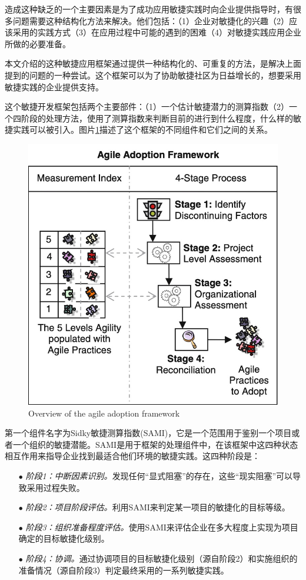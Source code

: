 \documentclass[twocolumn]{svjour3}[]
\begin{document}
造成这种缺乏的一个主要因素是为了成功应用敏捷实践时向企业提供指导时，有很多问题需要这种结构化方法来解决。他们包括：（1）企业对敏捷化的兴趣（2）应该采用的实践方式（3）在应用过程中可能的遇到的困难（4）对敏捷实践应用企业所做的必要准备。

本文介绍的这种敏捷应用框架通过提供一种结构化的、可重复的方法，是解决上面提到的问题的一种尝试。这个框架可以为了协助敏捷社区为日益增长的，想要采用敏捷实践的企业提供支持。

这个敏捷开发框架包括两个主要部件：（1）一个估计敏捷潜力的测算指数（2）一个四阶段的处理方法，使用了测算指数来判断目前的进行到什么程度，什么样的敏捷实践可以被引入。图片\ref{overview}描述了这个框架的不同组件和它们之间的关系。

\begin{figure} [htb]
    \centering
    \includegraphics[width=1.0\linewidth]{img/overview.jpg}
    \caption{Overview of the agile adoption framework}
    \label{overview}
\end{figure}

第一个组件名字为Sidky敏捷测算指数(SAMI)，它是一个范围用于鉴别一个项目或者一个组织的敏捷潜能。SAMI是用于框架的处理组件中，在该框架中这四种状态相互作用来指导企业找到最适合他们环境的敏捷实践。这四种阶段是：

\begin{itemize}
    \item[$\bullet$] \textit{阶段1：中断因素识别。}发现任何“显式阻塞”的存在，这些“现实阻塞”可以导致采用过程失败。
    \item[$\bullet$] \textit{阶段2：项目阶段评估。}利用SAMI来判定某一项目的敏捷化的目标等级。
    \item[$\bullet$] \textit{阶段3：组织准备程度评估。}使用SAMI来评估企业在多大程度上实现为项目确定的目标敏捷化级别。
    \item[$\bullet$] \textit{阶段4：协调。}通过协调项目的目标敏捷化级别（源自阶段2）和实施组织的准备情况（源自阶段3）判定最终采用的一系列敏捷实践。
\end{itemize}
\end{document}
